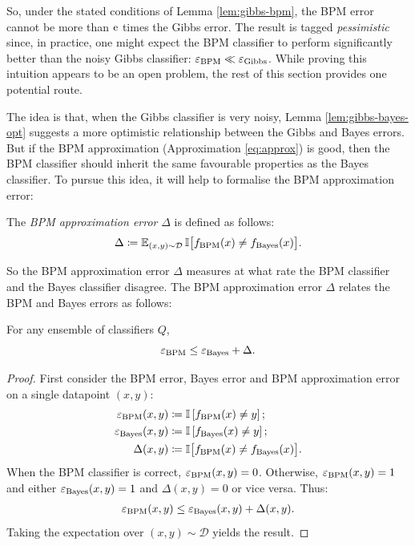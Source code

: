 \begin{refsection}
So, under the stated conditions of Lemma \ref{lem:gibbs-bpm}, the BPM error cannot be more than $\mathrm{e}$ times the Gibbs error. The result is tagged \textit{pessimistic} since, in practice, one might expect the BPM classifier to perform significantly better than the noisy Gibbs classifier: $\varepsilon_{\mathrm{BPM}}\ll\varepsilon_{\mathrm{Gibbs}}$. While proving this intuition appears to be an open problem, the rest of this section provides one potential route.

The idea is that, when the Gibbs classifier is very noisy, Lemma \ref{lem:gibbs-bayes-opt} suggests a more optimistic relationship between the Gibbs and Bayes errors. But if the BPM approximation (Approximation \ref{eq:approx}) is good, then the BPM classifier should inherit the same favourable properties as the Bayes classifier. To pursue this idea, it will help to formalise the BPM approximation error:

\begin{definition} The \textit{BPM approximation error} $\Delta$ is defined as follows: 
\begin{equation}
    \Delta \coloneqq \operatorname{\mathbb{E}}_{(x,y)\sim\mathcal{D}}\mathbb{I}\big[f_\mathrm{BPM}(x)\neq f_\mathrm{Bayes}(x)\big].
\end{equation}
\end{definition}
So the BPM approximation error $\Delta$ measures at what rate the BPM classifier and the Bayes classifier disagree. The BPM approximation error $\Delta$ relates the BPM and Bayes errors as follows:

\begin{lemma}\label{lem:bayes-bpm} For any ensemble of classifiers $Q$,
    \begin{equation*}
        \varepsilon_{\mathrm{BPM}} \leq \varepsilon_{\mathrm{Bayes}} + \Delta.
    \end{equation*}
\end{lemma}
\begin{proof}
    First consider the BPM error, Bayes error and BPM approximation error on a single datapoint $(x,y)$:
    \begin{align*}
    \varepsilon_{\mathrm{BPM}}(x,y) &\coloneqq \mathbb{I}\left[f_\mathrm{BPM}(x)\neq y\right]; \\
    \varepsilon_{\mathrm{Bayes}}(x,y)&\coloneqq \mathbb{I}\left[f_\mathrm{Bayes}(x)\neq y\right] ;\\
    \Delta(x,y) &\coloneqq \mathbb{I}\big[f_\mathrm{BPM}(x)\neq f_\mathrm{Bayes}(x)\big].
    \end{align*}
    When the BPM classifier is correct, $\varepsilon_{\mathrm{BPM}}(x,y)=0$. Otherwise, $\varepsilon_{\mathrm{BPM}}(x,y)=1$ and either $\varepsilon_{\mathrm{Bayes}}(x,y)=1$ and $\Delta(x,y)=0$ or vice versa. Thus:
    \begin{align*}
    \varepsilon_{\mathrm{BPM}}(x,y) \leq \varepsilon_{\mathrm{Bayes}}(x,y) + \Delta(x,y).
    \end{align*}
    Taking the expectation over $(x,y)\sim\mathcal{D}$ yields the result.
\end{proof}


\end{refsection}
